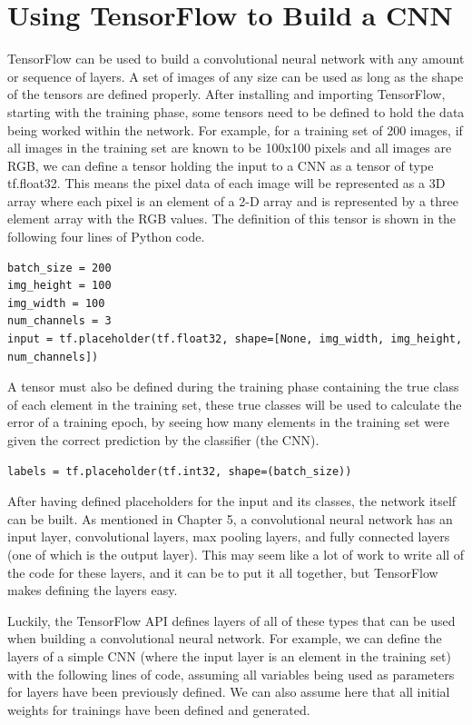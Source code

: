 \documentclass[12pt]{report} %
\begin{document}
\section{Using TensorFlow to Build a CNN}
	TensorFlow can be used to build a convolutional neural network with any amount or sequence of layers. A set of images of any size can be used as long as the shape of the tensors are defined properly. After installing and importing TensorFlow, starting with the training phase, some tensors need to be defined to hold the data being worked within the network. For example, for a training set of 200 images, if all images in the training set are known to be 100x100 pixels and all images are RGB, we can define a tensor holding the input to a CNN as a tensor of type tf.float32. This means the pixel data of each image will be represented as a 3D array where each pixel is an element of a 2-D array and is represented by a three element array with the RGB values. The definition of this tensor is shown in the following four lines of Python code.
\begin{lstlisting}
batch_size = 200
img_height = 100
img_width = 100
num_channels = 3
input = tf.placeholder(tf.float32, shape=[None, img_width, img_height, num_channels])
\end{lstlisting}

	A tensor must also be defined during the training phase containing the true class of each element in the training set, these true classes will be used to calculate the error of a training epoch, by seeing how many elements in the training set were given the correct prediction by the classifier (the CNN).
\begin{lstlisting}
labels = tf.placeholder(tf.int32, shape=(batch_size))
\end{lstlisting}
	
	After having defined placeholders for the input and its classes, the network itself can be built. As mentioned in Chapter 5, a convolutional neural network has an input layer, convolutional layers, max pooling layers, and fully connected layers (one of which is the output layer). This may seem like a lot of work to write all of the code for these layers, and it can be to put it all together, but TensorFlow makes defining the layers easy. 
	
	Luckily, the TensorFlow API defines layers of all of these types that can be used when building a convolutional neural network. For example, we can define the layers of a simple CNN (where the input layer is an element in the training set) with the following lines of code, assuming all variables being used as parameters for layers have been previously defined. We can also assume here that all initial weights for trainings have been defined and generated.
	
\end{document}
